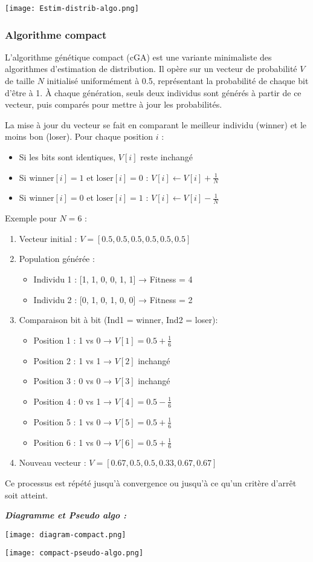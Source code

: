 \documentclass{article}
\begin{document}
\texttt{[image: Estim-distrib-algo.png]}

\subsubsection{Algorithme compact}
L'algorithme génétique compact (cGA) est une variante minimaliste des algorithmes d'estimation de distribution. Il opère sur un vecteur de probabilité $V$ de taille $N$ initialisé uniformément à 0.5, représentant la probabilité de chaque bit d'être à 1. À chaque génération, seuls deux individus sont générés à partir de ce vecteur, puis comparés pour mettre à jour les probabilités.

La mise à jour du vecteur se fait en comparant le meilleur individu (winner) et le moins bon (loser). Pour chaque position $i$ :
\begin{itemize}
    \item Si les bits sont identiques, $V[i]$ reste inchangé
    \item Si $\text{winner}[i] = 1$ et $\text{loser}[i] = 0$ : $V[i] \leftarrow V[i] + \frac{1}{N}$
    \item Si $\text{winner}[i] = 0$ et $\text{loser}[i] = 1$ : $V[i] \leftarrow V[i] - \frac{1}{N}$
\end{itemize}

Exemple pour $N = 6$ :

\begin{enumerate}
   \item Vecteur initial : $V = [0.5, 0.5, 0.5, 0.5, 0.5, 0.5]$

   \item Population générée :
   \begin{itemize}
       \item Individu 1 : [1, 1, 0, 0, 1, 1] → Fitness = 4
       \item Individu 2 : [0, 1, 0, 1, 0, 0] → Fitness = 2
   \end{itemize}

   \item Comparaison bit à bit (Ind1 = winner, Ind2 = loser):
   \begin{itemize}
       \item Position 1 : 1 vs 0 → $V[1] = 0.5 + \frac{1}{6}$
       \item Position 2 : 1 vs 1 → $V[2]$ inchangé
       \item Position 3 : 0 vs 0 → $V[3]$ inchangé
       \item Position 4 : 0 vs 1 → $V[4] = 0.5 - \frac{1}{6}$
       \item Position 5 : 1 vs 0 → $V[5] = 0.5 + \frac{1}{6}$
       \item Position 6 : 1 vs 0 → $V[6] = 0.5 + \frac{1}{6}$
   \end{itemize}

   \item Nouveau vecteur : $V = [0.67, 0.5, 0.5, 0.33, 0.67, 0.67]$
\end{enumerate}

Ce processus est répété jusqu'à convergence ou jusqu'à ce qu'un critère d'arrêt soit atteint.

\textbf{\textit{Diagramme et Pseudo algo :}}

\texttt{[image: diagram-compact.png]}

\texttt{[image: compact-pseudo-algo.png]}
\end{document}
